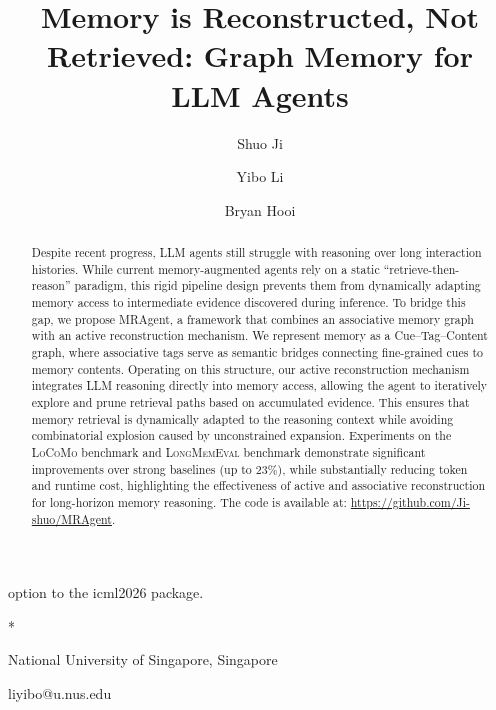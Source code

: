 \documentclass{llmxive}
\title{Memory is Reconstructed, Not Retrieved:  Graph Memory for LLM Agents}
\author{Shuo Ji \and Yibo Li \and Bryan Hooi}
\begin{document}
\maketitle
\begin{abstract}
Despite recent progress, LLM agents still struggle with reasoning over long interaction histories.
While current memory-augmented agents rely on a static ``retrieve-then-reason'' paradigm, this rigid pipeline design prevents them from dynamically adapting memory access to intermediate evidence discovered during inference.
To bridge this gap, we propose MRAgent, a framework that combines an associative memory graph with an active reconstruction mechanism. We represent memory as a Cue–Tag–Content graph, where associative tags serve as semantic bridges connecting fine-grained cues to memory contents.
Operating on this structure, our active reconstruction mechanism integrates LLM reasoning directly into memory access, allowing the agent to iteratively explore and prune retrieval paths based on accumulated evidence. This ensures that memory retrieval is dynamically adapted to the  reasoning context while avoiding combinatorial explosion caused by unconstrained expansion.
Experiments on the \textsc{LoCoMo} benchmark  and \textsc{LongMemEval} benchmark  demonstrate significant improvements over strong baselines (up to $23\%$), while substantially reducing token and runtime cost, highlighting the effectiveness of active and associative reconstruction for long-horizon memory reasoning. The code is available at: \url{https://github.com/Ji-shuo/MRAgent}.
\end{abstract}
option to the icml2026 package.


  {*}

  

  {National University of Singapore, Singapore}

  {liyibo@u.nus.edu}

  
\end{document}
